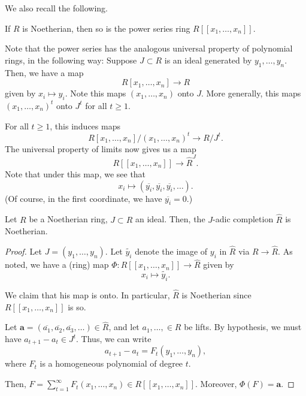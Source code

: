 \documentclass[12pt]{article}
\begin{document}
We also recall the following.
\begin{thm}
	If $R$ is Noetherian, then so is the power series ring $R[\![x_{1}, \ldots, x_{n}]\!]$.
\end{thm}

Note that the power series has the analogous universal property of polynomial rings, in the following way: Suppose $J \subset R$ is an ideal generated by $y_{1}, \ldots, y_{n}$. \newline
Then, we have a map
\begin{equation*} 
	R[x_{1}, \ldots, x_{n}] \to R
\end{equation*}
given by $x_{i} \mapsto y_{i}$. Note this maps $(x_{1}, \ldots, x_{n})$ onto $J$. More generally, this maps $(x_{1}, \ldots, x_{n})^{t}$ onto $J^{t}$ for all $t \ge 1$.

For all $t \ge 1$, this induces maps
\begin{equation*} 
	R[x_{1}, \ldots, x_{n}]/(x_{1}, \ldots, x_{n})^{t} \to R/J^{t}.	
\end{equation*}
The universal property of limits now gives us a map
\begin{equation*} 
	R[\![x_{1}, \ldots, x_{n}]\!] \to \widehat{R}^{J}.
\end{equation*}
Note that under this map, we see that
\begin{equation*} 
	x_{i} \mapsto (\overline{y_{i}}, \overline{y_{i}}, \overline{y_{i}}, \ldots).
\end{equation*}
(Of course, in the first coordinate, we have $\overline{y_{i}} = 0$.)

\begin{thm}
	Let $R$ be a Noetherian ring, $J \subset R$ an ideal. \newline
	Then, the $J$-adic completion $\widehat{R}$ is Noetherian.
\end{thm}
\begin{proof} 
	Let $J = (y_{1}, \ldots, y_{n})$. Let $\widetilde{y_{i}}$ denote the image of $y_{i}$ in $\widehat{R}$ via $R \to \widehat{R}$. \newline
	As noted, we have a (ring) map $\Phi : R[\![x_{1}, \ldots, x_{n}]\!] \to \widehat{R}$ given by
	\begin{equation*} 
		x_{i} \mapsto \widetilde{y_{i}}.
	\end{equation*}

	We claim that his map is onto. In particular, $\widehat{R}$ is Noetherian since $R[\![x_{1}, \ldots, x_{n}]\!]$ is so.

	Let $\mathbf{a} = (\overline{a_{1}}, \overline{a_{2}}, \overline{a_{3}}, \ldots) \in \widehat{R}$, and let $a_{1}, \ldots, \in R$ be lifts. \newline
	By hypothesis, we must have $a_{t + 1} - a_{t} \in J^{t}$. Thus, we can write
	\begin{equation*} 
		a_{t + 1} - a_{t} = F_{t}(y_{1}, \ldots, y_{n}),
	\end{equation*}
	where $F_{t}$ is a homogeneous polynomial of degree $t$. 

	Then, $F = \sum_{t = 1}^{\infty} F_{t}(x_{1}, \ldots, x_{n}) \in R[\![x_{1}, \ldots, x_{n}]\!]$. Moreover, $\Phi(F) = \mathbf{a}$.  
\end{proof}
\end{document}
